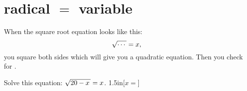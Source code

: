\section{radical $=$ variable}

\begin{tcolorbox}[center,width=5.5in,colback=white]
    When the square root equation looks like this:
    {
    \[
        \myRoot{\cdots} = x \text{,}
    \]
    }%
    you {square} {both} {sides} which will give you a quadratic equation. 
    Then you  check for  .
\end{tcolorbox}

\myWideProblem
{
    Solve this equation: \quad $\myRoot{20-x} = x$.
}{1.5in}[\raggedleft$x=$]